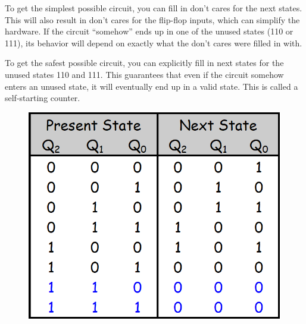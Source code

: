 To get the simplest possible circuit, you can fill in don't cares for the next states. This will also result in don't cares for the flip-flop inputs, which can simplify the hardware. If the circuit ``somehow'' ends up in one of the unused states (110 or 111), its behavior will depend on exactly what the don't cares were filled in with.

To get the safest possible circuit, you can explicitly fill in next states for the unused states 110 and 111. This guarantees that even if the circuit somehow enters an unused state, it will eventually end up in a valid state. This is called a self-starting counter.

\vspace*{\fill}
\columnbreak

\begin{figure}[H]
  \centering
  \begin{minipage}{0.49\linewidth}
    \centering
    \includegraphics[width=\linewidth]{img/self-starting-counter-table.png}
    \label{fig:self-starting-counter-table.png}
  \end{minipage}\hfill
  \begin{minipage}{0.49\linewidth}
    \centering

\end{minipage}
\end{figure}
